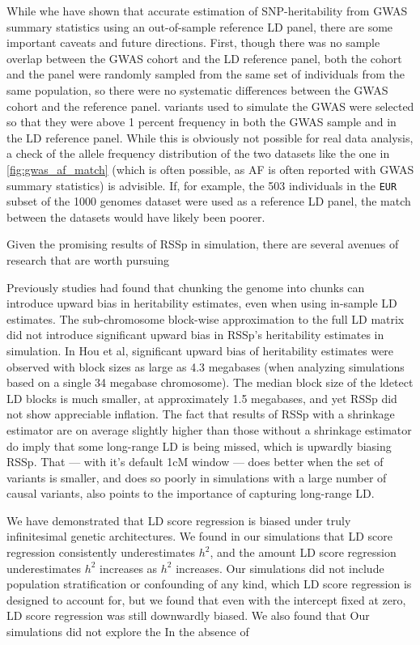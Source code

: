 While whe have shown that accurate estimation of SNP-heritability from GWAS summary statistics using an out-of-sample reference LD panel, there are some important caveats and future directions.  First, though there was no sample overlap between the GWAS cohort and the LD reference panel, both the cohort and the panel were randomly sampled from the same set of individuals from the same population, so there were no systematic differences between the GWAS cohort and the reference panel. 
variants used to simulate the GWAS were selected so that they were above 1 percent frequency in both the GWAS sample and in the LD reference panel. While this is obviously not possible for real data analysis, a check of the allele frequency distribution of the two datasets like the one in \ref{fig:gwas_af_match} (which is often possible, as AF is often reported with GWAS summary statistics) is advisible.  If, for example, the 503 individuals in the \texttt{EUR} subset of the 1000 genomes dataset were used as a reference LD panel, the match between the datasets would have likely been poorer.

Given the promising results of RSSp in simulation, there are several avenues of research that are worth pursuing

Previously studies had found that chunking the genome into chunks can introduce upward bias in heritability estimates, even when using in-sample LD estimates\cite{Hou_2019}.  The sub-chromosome block-wise approximation to the full LD matrix did not introduce significant upward bias in RSSp's heritability estimates in simulation.  In Hou et al, significant upward bias of heritability estimates were observed with block sizes as large as 4.3 megabases (when analyzing simulations based on a single 34 megabase chromosome).  The median block size of the ldetect LD blocks is much smaller, at approximately 1.5 megabases, and yet RSSp did not show appreciable inflation.  The fact that results of RSSp with a shrinkage estimator are on average slightly higher than those without a shrinkage estimator do imply that some long-range LD is being missed, which is upwardly biasing RSSp.  That  --- with it's default 1cM window --- does better when the set of variants is smaller, and does so poorly in simulations with a large number of causal variants, also points to the importance of capturing long-range LD.  

We have demonstrated that LD score regression is biased under truly infinitesimal genetic architectures.   We found in our simulations that LD score regression consistently underestimates $h^2$, and the amount LD score regression underestimates $h^2$ increases as $h^2$ increases.  Our simulations did not include population stratification or confounding of any kind, which LD score regression is designed to account for, but we found that even with the intercept fixed at zero, LD score regression was still downwardly biased. We also found that  
Our simulations did not explore the In the absence of








